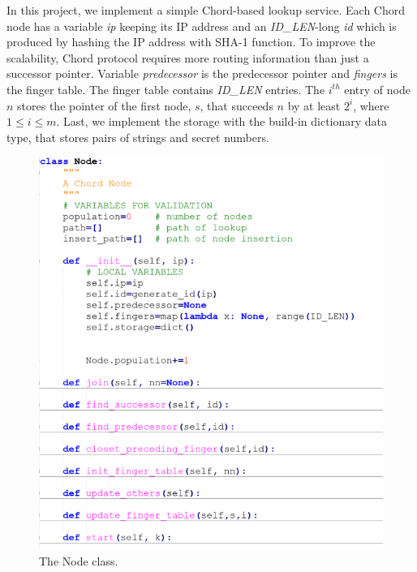 \documentclass{article}
\begin{document}
In this project, we implement a simple Chord-based lookup service. Each Chord node has a variable \textit{ip} keeping its IP address and an \textit{ID\_LEN}-long \textit{id} which is produced by hashing the IP address with SHA-1 function. To improve the scalability, Chord protocol requires more routing information than just a successor pointer. Variable \textit{predecessor} is the predecessor pointer and \textit{fingers} is the finger table. The finger table contains \textit{ID\_LEN} entries. The $i^{th}$ entry of node $n$ stores the pointer of the first node, $s$, that succeeds $n$ by at least $2^i$, where $1 \leq i \leq m$. Last, we implement the storage with the build-in dictionary data type, that stores pairs of strings and secret numbers.
\begin{figure}[H]
\centering
\includegraphics[scale=1.5]{Node.PNG}
\caption{The Node class.
\label{node}}
\end{figure}
\end{document}
